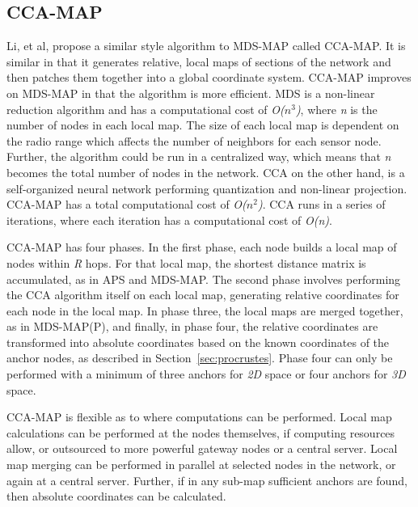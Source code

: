 \subsection{CCA-MAP} \label{sec:CCA-MAP}
Li, et al, propose a similar style algorithm to MDS-MAP called CCA-MAP\cite{CCA-MAP07,CCA-MAP09}.  It is similar in that it generates relative, local maps of sections of the network and then patches them together into a global coordinate system.  CCA-MAP improves on MDS-MAP in that the algorithm is more efficient.  MDS is a non-linear reduction algorithm and has a computational cost of \emph{O($n^{3}$)}, where \emph{n} is the number of nodes in each local map.  The size of each local map is dependent on the radio range which affects the number of neighbors for each sensor node.  Further, the algorithm could be run in a centralized way, which means that \emph{n} becomes the total number of nodes in the network. CCA\cite{CCA} on the other hand, is a self-organized neural network performing quantization and non-linear projection.  CCA-MAP has a total computational cost of \emph{O($n^{2}$)}.  CCA runs in a series of iterations, where each iteration has a computational cost of \emph{O(n)}.

CCA-MAP has four phases.  In the first phase, each node builds a local map of nodes within \emph{R} hops.  For that local map, the shortest distance matrix is accumulated, as in APS and MDS-MAP.  The second phase involves performing the CCA algorithm itself on each local map, generating relative coordinates for each node in the local map.  In phase three, the local maps are merged together, as in MDS-MAP(P), and finally, in phase four, the relative coordinates are transformed into absolute coordinates based on the known coordinates of the anchor nodes, as described in Section~\ref{sec:procrustes}.  Phase four can only be performed with a minimum of three anchors for \emph{2D} space or four anchors for \emph{3D} space.  

CCA-MAP is flexible as to where computations can be performed. Local map calculations can be performed at the nodes themselves, if computing resources allow, or outsourced to more powerful gateway nodes or a central server.  Local map merging can be performed in parallel at selected nodes in the network, or again at a central server.  Further, if in any sub-map sufficient anchors are found, then absolute coordinates can be calculated.

